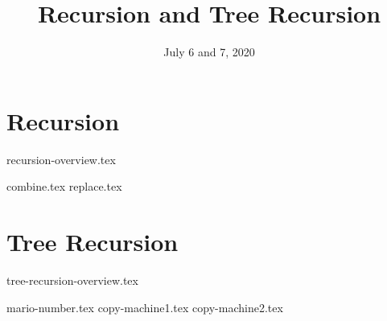 \documentclass{exam}
\title{Recursion and Tree Recursion}
\date{July 6 and 7, 2020}
\begin{document}
\maketitle

\section{Recursion}
{recursion-overview.tex}
\begin{questions}
{combine.tex}
\newpage
{replace.tex}
\end{questions}

\newpage
\section{Tree Recursion}
{tree-recursion-overview.tex}
\begin{questions}
{mario-number.tex}
{copy-machine1.tex}
\newpage
{copy-machine2.tex}
\end{questions}
\end{document}
